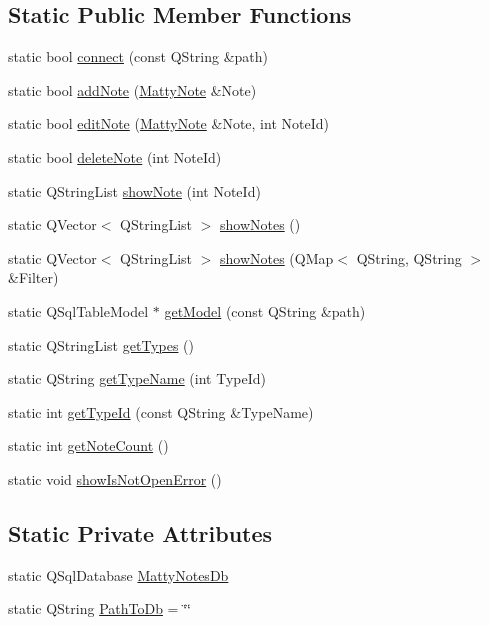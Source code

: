 \subsection*{Static Public Member Functions}
\begin{DoxyCompactItemize}
\item 
static bool \hyperlink{classDbManager_abc90b3bf97dda268b4160a0662305898}{connect} (const Q\+String \&path)
\item 
static bool \hyperlink{classDbManager_a4f063b57678616ccef3515088a04ac51}{add\+Note} (\hyperlink{classMattyNote}{Matty\+Note} \&Note)
\item 
static bool \hyperlink{classDbManager_af27c0367d70db496305ec5cab6324fe9}{edit\+Note} (\hyperlink{classMattyNote}{Matty\+Note} \&Note, int Note\+Id)
\item 
static bool \hyperlink{classDbManager_a164849758fd05445c7af2cc04fc3569f}{delete\+Note} (int Note\+Id)
\item 
static Q\+String\+List \hyperlink{classDbManager_a51a53e4f7776ca83da7fafe7036adf17}{show\+Note} (int Note\+Id)
\item 
static Q\+Vector$<$ Q\+String\+List $>$ \hyperlink{classDbManager_a67826fcd32d3921d1d1ae32ff3e9ce5d}{show\+Notes} ()
\item 
static Q\+Vector$<$ Q\+String\+List $>$ \hyperlink{classDbManager_a6e04515110041436021b5ee0f068eda2}{show\+Notes} (Q\+Map$<$ Q\+String, Q\+String $>$ \&Filter)
\item 
static Q\+Sql\+Table\+Model $\ast$ \hyperlink{classDbManager_ac4e759380194e624382e267432de5357}{get\+Model} (const Q\+String \&path)
\item 
static Q\+String\+List \hyperlink{classDbManager_ade7585873652935bb12cb1ad546ceba2}{get\+Types} ()
\item 
static Q\+String \hyperlink{classDbManager_a6cb58e12049873e8b1b4b6ecd74dbfb6}{get\+Type\+Name} (int Type\+Id)
\item 
static int \hyperlink{classDbManager_a92ebefd0d5fae643db1fc51cc7ea0c31}{get\+Type\+Id} (const Q\+String \&Type\+Name)
\item 
static int \hyperlink{classDbManager_ae3998b50545d88a27d4361053f39b050}{get\+Note\+Count} ()
\item 
static void \hyperlink{classDbManager_a2d60ab2a556cf0276bf306c7545ed03d}{show\+Is\+Not\+Open\+Error} ()
\end{DoxyCompactItemize}
\subsection*{Static Private Attributes}
\begin{DoxyCompactItemize}
\item 
static Q\+Sql\+Database \hyperlink{classDbManager_a3f6052f559a7a72eef66848ebc9f3eaa}{Matty\+Notes\+Db}
\item 
static Q\+String \hyperlink{classDbManager_aa3f62582e546ee853cebd75386e26736}{Path\+To\+Db} = \char`\"{}\char`\"{}
\end{DoxyCompactItemize}


